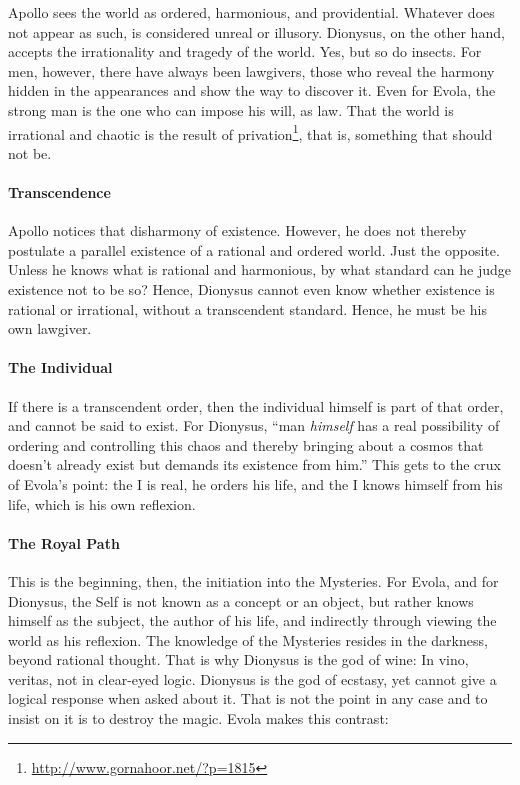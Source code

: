 Apollo sees the world as ordered, harmonious, and providential. Whatever does not appear as such, is considered unreal or illusory. Dionysus, on the other hand, accepts the irrationality and tragedy of the world. Yes, but so do insects. For men, however, there have always been lawgivers, those who reveal the harmony hidden in the appearances and show the way to discover it. Even for Evola, the strong man is the one who can impose his will, as law. That the world is irrational and chaotic is the result of privation\footnote{\url{http://www.gornahoor.net/?p=1815}}, that is, something that should not be.

\paragraph{Transcendence}


Apollo notices that disharmony of existence. However, he does not thereby postulate a parallel existence of a rational and ordered world. Just the opposite. Unless he knows what is rational and harmonious, by what standard can he judge existence not to be so? Hence, Dionysus cannot even know whether existence is rational or irrational, without a transcendent standard. Hence, he must be his own lawgiver.

\paragraph{The Individual}


If there is a transcendent order, then the individual himself is part of that order, and cannot be said to exist. For Dionysus, ``man \emph{himself} has a real possibility of ordering and controlling this chaos and thereby bringing about a cosmos that doesn't already exist but demands its existence from him.'' This gets to the crux of Evola's point: the I is real, he orders his life, and the I knows himself from his life, which is his own reflexion.

\paragraph{The Royal Path}


This is the beginning, then, the initiation into the Mysteries. For Evola, and for Dionysus, the Self is not known as a concept or an object, but rather knows himself as the subject, the author of his life, and indirectly through viewing the world as his reflexion. The knowledge of the Mysteries resides in the darkness, beyond rational thought. That is why Dionysus is the god of wine: In vino, veritas, not in clear-eyed logic. Dionysus is the god of ecstasy, yet cannot give a logical response when asked about it. That is not the point in any case and to insist on it is to destroy the magic. Evola makes this contrast:

